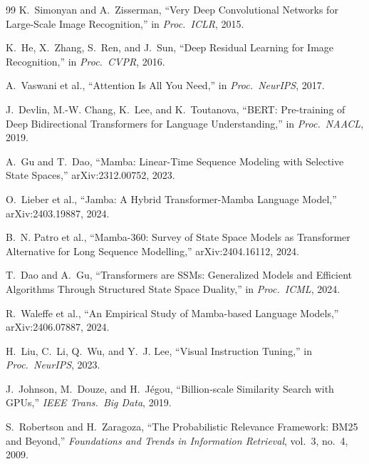 \documentclass[conference]{IEEEtran}
\begin{document}
\begin{thebibliography}{99}
 K.~Simonyan and A.~Zisserman, ``Very Deep Convolutional
Networks for Large-Scale Image Recognition,'' in \emph{Proc.\ ICLR}, 2015.

 K.~He, X.~Zhang, S.~Ren, and J.~Sun, ``Deep Residual
Learning for Image Recognition,'' in \emph{Proc.\ CVPR}, 2016.

 A.~Vaswani et al., ``Attention Is All You Need,'' in
\emph{Proc.\ NeurIPS}, 2017.

 J.~Devlin, M.-W. Chang, K.~Lee, and K.~Toutanova, ``BERT:
Pre-training of Deep Bidirectional Transformers for Language
Understanding,'' in \emph{Proc.\ NAACL}, 2019.

 A.~Gu and T.~Dao, ``Mamba: Linear-Time Sequence Modeling
with Selective State Spaces,'' arXiv:2312.00752, 2023.

 O.~Lieber et al., ``Jamba: A Hybrid Transformer-Mamba
Language Model,'' arXiv:2403.19887, 2024.

 B.~N. Patro et al., ``Mamba-360: Survey of State Space
Models as Transformer Alternative for Long Sequence Modelling,''
arXiv:2404.16112, 2024.

 T.~Dao and A.~Gu, ``Transformers are SSMs: Generalized
Models and Efficient Algorithms Through Structured State Space Duality,''
in \emph{Proc.\ ICML}, 2024.

 R.~Waleffe et al., ``An Empirical Study of
Mamba-based Language Models,'' arXiv:2406.07887, 2024.

 H.~Liu, C.~Li, Q.~Wu, and Y.~J. Lee, ``Visual Instruction
Tuning,'' in \emph{Proc.\ NeurIPS}, 2023.

 J.~Johnson, M.~Douze, and H.~J\'egou, ``Billion-scale
Similarity Search with GPUs,'' \emph{IEEE Trans.\ Big Data}, 2019.

 S.~Robertson and H.~Zaragoza, ``The Probabilistic Relevance
Framework: BM25 and Beyond,'' \emph{Foundations and Trends in Information
Retrieval}, vol.~3, no.~4, 2009.

\end{thebibliography}
\end{document}
